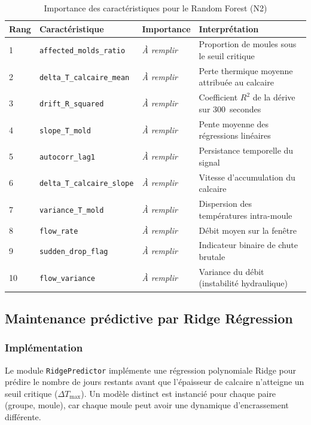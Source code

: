\begin{table}[htbp]
\centering
\renewcommand{\arraystretch}{1.45}
\caption{Importance des caractéristiques pour le Random Forest (N2)}
\label{tab:feature_importance}
\begin{tabular}{|p{}|p{}|p{}|p{}|}
\hline
\rowcolor{gray!25}
\textbf{Rang} & \textbf{Caractéristique} & \textbf{Importance} & \textbf{Interprétation} \\
\hline
1 & \texttt{affected\_molds\_ratio} & \textit{À remplir} & Proportion de moules sous le seuil critique \\
\hline
2 & \texttt{delta\_T\_calcaire\_mean} & \textit{À remplir} & Perte thermique moyenne attribuée au calcaire \\
\hline
3 & \texttt{drift\_R\_squared} & \textit{À remplir} & Coefficient \(R^2\) de la dérive sur 300~secondes \\
\hline
4 & \texttt{slope\_T\_mold} & \textit{À remplir} & Pente moyenne des régressions linéaires \\
\hline
5 & \texttt{autocorr\_lag1} & \textit{À remplir} & Persistance temporelle du signal \\
\hline
6 & \texttt{delta\_T\_calcaire\_slope} & \textit{À remplir} & Vitesse d'accumulation du calcaire \\
\hline
7 & \texttt{variance\_T\_mold} & \textit{À remplir} & Dispersion des températures intra-moule \\
\hline
8 & \texttt{flow\_rate} & \textit{À remplir} & Débit moyen sur la fenêtre \\
\hline
9 & \texttt{sudden\_drop\_flag} & \textit{À remplir} & Indicateur binaire de chute brutale \\
\hline
10 & \texttt{flow\_variance} & \textit{À remplir} & Variance du débit (instabilité hydraulique) \\
\hline
\end{tabular}
\end{table}

\subsection{Maintenance prédictive par Ridge Régression}

\subsubsection{Implémentation}

Le module \texttt{RidgePredictor} implémente une régression polynomiale Ridge pour prédire le nombre de jours restants avant que l'épaisseur de calcaire n'atteigne un seuil critique (\(\Delta T_{\text{max}}\)). Un modèle distinct est instancié pour chaque paire (groupe, moule), car chaque moule peut avoir une dynamique d'encrassement différente.

